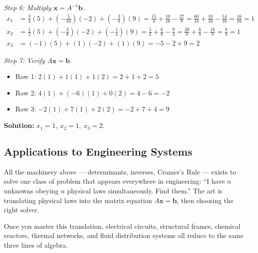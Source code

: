 \documentclass[12pt,a4paper]{article}
\begin{document}
\textit{Step 6: Multiply \(\mathbf{x} = A^{-1}\mathbf{b}\).}
\begin{align*}
x_1 &= \frac{3}{4}(5) + \left(-\frac{5}{16}\right)(-2) + \left(-\frac{3}{8}\right)(9)
     = \frac{15}{4} + \frac{10}{16} - \frac{27}{8}
     = \frac{60}{16} + \frac{10}{16} - \frac{54}{16}
     = \frac{16}{16} = 1 \\
x_2 &= \frac{1}{2}(5) + \left(-\frac{3}{8}\right)(-2) + \left(-\frac{1}{4}\right)(9)
     = \frac{5}{2} + \frac{6}{8} - \frac{9}{4}
     = \frac{20}{8} + \frac{6}{8} - \frac{18}{8}
     = \frac{8}{8} = 1 \\
x_3 &= (-1)(5) + (1)(-2) + (1)(9)
     = -5 - 2 + 9 = 2
\end{align*}

\textit{Step 7: Verify \(A\mathbf{x} = \mathbf{b}\).}
\begin{itemize}[noitemsep]
  \item Row 1: \(2(1)+1(1)+1(2) = 2+1+2 = 5\) \checkmark
  \item Row 2: \(4(1)+(-6)(1)+0(2) = 4-6 = -2\) \checkmark
  \item Row 3: \(-2(1)+7(1)+2(2) = -2+7+4 = 9\) \checkmark
\end{itemize}

\textbf{Solution:} \(x_1 = 1,\ x_2 = 1,\ x_3 = 2\).

\subsection{Applications to Engineering Systems}

All the machinery above --- determinants, inverses, Cramer's Rule --- exists to solve one class of problem that appears everywhere in engineering: ``I have \(n\) unknowns obeying \(n\) physical laws simultaneously. Find them.'' The art is translating physical laws into the matrix equation \(A\mathbf{x} = \mathbf{b}\), then choosing the right solver.

Once you master this translation, electrical circuits, structural frames, chemical reactors, thermal networks, and fluid distribution systems all reduce to the same three lines of algebra.
\end{document}
